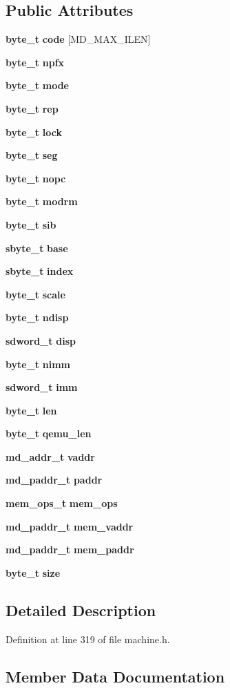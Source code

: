 \subsection*{Public Attributes}
\begin{CompactItemize}
\item 
{\bf byte\_\-t} {\bf code} [MD\_\-MAX\_\-ILEN]
\item 
{\bf byte\_\-t} {\bf npfx}
\item 
{\bf byte\_\-t} {\bf mode}
\item 
{\bf byte\_\-t} {\bf rep}
\item 
{\bf byte\_\-t} {\bf lock}
\item 
{\bf byte\_\-t} {\bf seg}
\item 
{\bf byte\_\-t} {\bf nopc}
\item 
{\bf byte\_\-t} {\bf modrm}
\item 
{\bf byte\_\-t} {\bf sib}
\item 
{\bf sbyte\_\-t} {\bf base}
\item 
{\bf sbyte\_\-t} {\bf index}
\item 
{\bf byte\_\-t} {\bf scale}
\item 
{\bf byte\_\-t} {\bf ndisp}
\item 
{\bf sdword\_\-t} {\bf disp}
\item 
{\bf byte\_\-t} {\bf nimm}
\item 
{\bf sdword\_\-t} {\bf imm}
\item 
{\bf byte\_\-t} {\bf len}
\item 
{\bf byte\_\-t} {\bf qemu\_\-len}
\item 
{\bf md\_\-addr\_\-t} {\bf vaddr}
\item 
{\bf md\_\-paddr\_\-t} {\bf paddr}
\item 
{\bf mem\_\-ops\_\-t} {\bf mem\_\-ops}
\item 
{\bf md\_\-paddr\_\-t} {\bf mem\_\-vaddr}
\item 
{\bf md\_\-paddr\_\-t} {\bf mem\_\-paddr}
\item 
{\bf byte\_\-t} {\bf size}
\end{CompactItemize}


\subsection{Detailed Description}


Definition at line 319 of file machine.h.

\subsection{Member Data Documentation}
